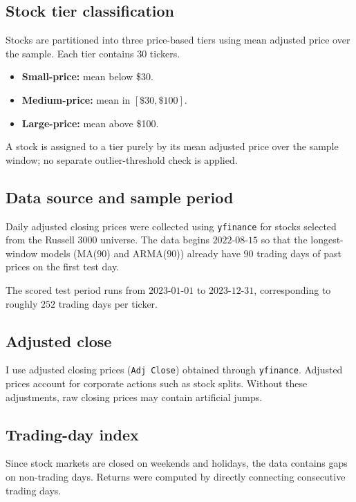 \documentclass[10pt,a4paper,twocolumn]{article}
\begin{document}
\subsection{Stock tier classification}
\label{sec:tier-classification}

Stocks are partitioned into three price-based tiers using mean adjusted price over the sample. Each tier contains $30$ tickers.

\begin{itemize}\itemsep0pt
  \item \textbf{Small-price:} mean below \$30.

  \item \textbf{Medium-price:} mean in $[\$30, \$100]$.

  \item \textbf{Large-price:} mean above \$100.
\end{itemize}
A stock is assigned to a tier purely by its mean adjusted price over the sample window; no separate outlier-threshold check is applied.

\subsection{Data source and sample period}

Daily adjusted closing prices were collected using \texttt{yfinance} for stocks selected from the Russell 3000 universe. The data begins $2022$-$08$-$15$ so that the longest-window models (MA($90$) and ARMA($90$)) already have $90$ trading days of past prices on the first test day.

The scored test period runs from $2023$-$01$-$01$ to $2023$-$12$-$31$, corresponding to roughly $252$ trading days per ticker.

\subsection{Adjusted close}

I use adjusted closing prices (\texttt{Adj Close}) obtained through \texttt{yfinance}. Adjusted prices account for corporate actions such as stock splits. Without these adjustments, raw closing prices may contain artificial jumps.

\subsection{Trading-day index}

Since stock markets are closed on weekends and holidays, the data contains gaps on non-trading days. Returns were computed by directly connecting consecutive trading days.
\end{document}
